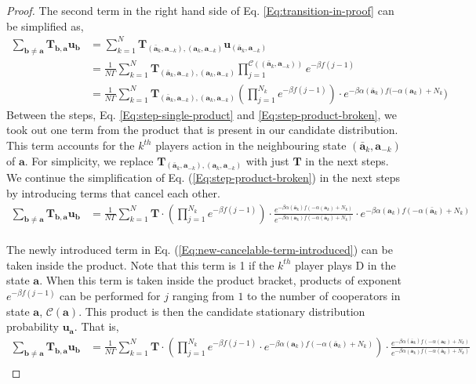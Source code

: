 \documentclass[11pt]{article}
\theoremstyle{plainCl1}
\theoremstyle{plainCl2}
\newcommand{\abf}{\mathbf{a}}
\newcommand{\bbf}{\mathbf{b}}
\newcommand{\T}{\mathbf{T}}
\newcommand{\ubf}{\mathbf{u}}
\newcommand{\D}{\mathrm{D}}
\begin{document}
\begin{proof}
The second term in the right hand side of Eq. \ref{Eq:transition-in-proof} can be simplified as, 
\begin{align}
\sum_{\bbf \neq \abf} \T_{\bbf, \abf} \ubf_{\bbf} &= \sum_{k=1}^N \T_{(\bar{\abf}_k, \abf_{-k}),(\abf_k, \abf_{-k})} \ubf_{(\bar{\abf}_k, \abf_{-k})} \\[10pt]
\label{Eq:step-single-product}
&= \frac{1}{N \Gamma} \sum_{k=1}^N \T_{(\bar{\abf}_k, \abf_{-k}),(\abf_k, \abf_{-k})} \displaystyle \prod_{j=1}^{\mathcal{C}((\bar{\abf}_k, \abf_{-k}))} e^{-\beta f(j-1)}\\[10pt]
&=  \frac{1}{N \Gamma} \sum_{k=1}^N \T_{(\bar{\abf}_k, \abf_{-k}),(\abf_k, \abf_{-k})} \displaystyle \left( \prod_{j=1}^{N_k}  e^{-\beta f(j-1)} \right) \cdot e^{-\beta \alpha(\bar{\abf}_k)f(-\alpha(\abf_k)+ N_k})
\label{Eq:step-product-broken}
\end{align}
Between the steps, Eq. \ref{Eq:step-single-product} and \ref{Eq:step-product-broken}, we took out one term from the product that is present in our candidate distribution. This term accounts for the $k^{th}$ players action in the neighbouring state $(\bar{\abf}_k, \abf_{-k})$ of $\abf$. For simplicity, we replace $\T_{(\bar{\abf}_k, \abf_{-k}),(\abf_k, \abf_{-k})}$ with just $\T$ in the next steps. We continue the simplification of Eq. (\ref{Eq:step-product-broken}) in the next steps by introducing terms that cancel each other. \\[10pt]
\begin{align}
\sum_{\bbf \neq \abf} \T_{\bbf, \abf} \ubf_{\bbf} &=  \frac{1}{N \Gamma} \sum_{k=1}^N \T \cdot \displaystyle \left( \prod_{j=1}^{N_k}  e^{-\beta f(j-1)} \right) \cdot \frac{e^{-\beta \alpha(\bar{\abf}_k)f(-\alpha(\abf_k)+ N_k)}}{e^{-\beta \alpha(\abf_k)f(-\alpha(\bar{\abf}_k) +N_k)}} \cdot e^{-\beta \alpha(\abf_k)f(-\alpha(\bar{\abf}_k) + N_k)}
\label{Eq:new-cancelable-term-introduced}
\end{align}
\\ \noindent The newly introduced term in Eq. (\ref{Eq:new-cancelable-term-introduced}) can be taken inside the product. Note that this term is 1 if the $k^{th}$ player plays $\D$ in the state $\abf$. When this term is taken inside the product bracket, products of exponent $e^{-\beta f(j-1)}$ can be performed for $j$ ranging from $1$ to the number of cooperators in state $\abf$, $\mathcal{C}(\abf)$. This product is then the candidate stationary distribution probability $\ubf_\abf$. That is, 
\begin{align}
\sum_{\bbf \neq \abf} \T_{\bbf, \abf} \ubf_{\bbf} &=  \frac{1}{N \Gamma} \sum_{k=1}^N \T \cdot \displaystyle \left( \prod_{j=1}^{N_k}  e^{-\beta f(j-1)} \cdot e^{-\beta \alpha(\abf_k)f(-\alpha(\bar{\abf}_k) + N_k)} \right) \cdot \frac{e^{-\beta \alpha(\bar{\abf}_k)f(-\alpha(\abf_k)+ N_k)}}{e^{-\beta \alpha(\abf_k)f(-\alpha(\bar{\abf}_k) +N_k)}} \\[10pt]

\end{align}
\end{proof}
\end{document}
